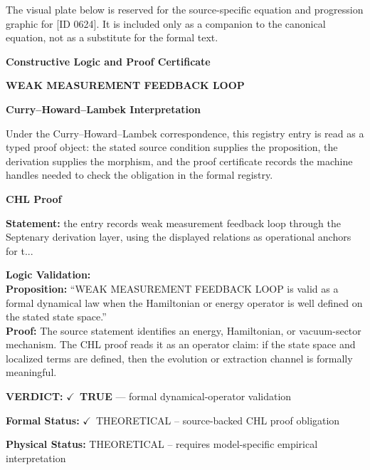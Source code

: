 \begingroup\footnotesize\sloppy
The visual plate below is reserved for the source-specific equation and progression graphic for [ID 0624]. It is included only as a companion to the canonical equation, not as a substitute for the formal text.
\par\endgroup
\ifTZPDarkEdition
{}
\fi

\clearpage
\begingroup\tzpsupportsetup
\noindent\textbf{\fontsize{10.8pt}{12.8pt}\selectfont [ID 0624] Constructive Logic and Proof Certificate}\par
\noindent\textbf{\fontsize{10pt}{12pt}\selectfont WEAK MEASUREMENT FEEDBACK LOOP}\par
\vspace{0.45em}
\begingroup
\footnotesize
\setlength{\parskip}{0.22em}
\setlength{\parindent}{0pt}
\noindent\textbf{Curry--Howard--Lambek Interpretation}\par
Under the Curry--Howard--Lambek correspondence, this registry entry is read as a typed proof
object: the stated source condition supplies the proposition, the derivation supplies the
morphism, and the proof certificate records the machine handles needed to check the obligation
in the formal registry.

\vspace{0.45em}
\noindent\textbf{CHL Proof}\par
\textbf{Statement:} the entry records weak measurement feedback loop through the Septenary derivation layer,
using the displayed relations as operational anchors for t...

\textbf{Logic Validation:}\\
\textbf{Proposition:} ``WEAK MEASUREMENT FEEDBACK LOOP is valid as a formal dynamical law when the Hamiltonian
or energy operator is well defined on the stated state space.''\\
\textbf{Proof:} The source statement identifies an energy, Hamiltonian, or vacuum-sector mechanism. The
CHL proof reads it as an operator claim: if the state space and localized terms are
defined, then the evolution or extraction channel is formally meaningful.

\textbf{VERDICT:} \ensuremath{\checkmark}\ \textbf{TRUE} --- formal dynamical-operator validation

\textbf{Formal Status:} \ensuremath{\checkmark}\ THEORETICAL -- source-backed CHL proof obligation

\textbf{Physical Status:} THEORETICAL -- requires model-specific empirical interpretation
\par\vspace{0.45em}
\par
\ifTZPDarkEdition
{}
\fi
\endgroup
\endgroup
